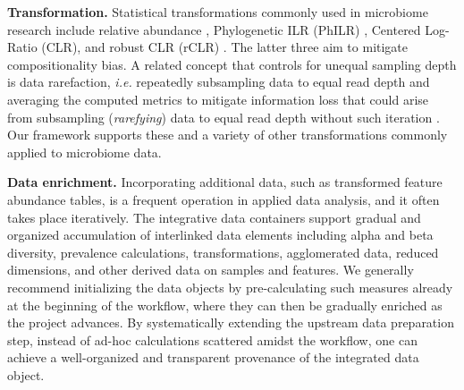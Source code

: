 \documentclass[
  sn-nature,
]{sn-jnl}
\begin{document}
\textbf{Transformation.} Statistical transformations commonly used in
microbiome research include relative abundance \citep{gloor2017},
Phylogenetic ILR (PhILR) \citep{silverman2017}, Centered Log-Ratio
(CLR), and robust CLR (rCLR) \citep{martino2019}. The latter three aim
to mitigate compositionality bias. A related concept that controls for
unequal sampling depth is data rarefaction, \emph{i.e.} repeatedly
subsampling data to equal read depth and averaging the computed metrics
to mitigate information loss \citep{schloss2024b} that could arise from
subsampling (\emph{rarefying}) data to equal read depth without such
iteration \citep{mcmurdie2014, schloss2024, willis2019b}. Our framework
supports these and a variety of other transformations commonly applied
to microbiome data.

\textbf{Data enrichment.} Incorporating additional data, such as
transformed feature abundance tables, is a frequent operation in applied
data analysis, and it often takes place iteratively. The integrative
data containers support gradual and organized accumulation of
interlinked data elements including alpha and beta diversity, prevalence
calculations, transformations, agglomerated data, reduced dimensions,
and other derived data on samples and features. We generally recommend
initializing the data objects by pre-calculating such measures already
at the beginning of the workflow, where they can then be gradually
enriched as the project advances. By systematically extending the
upstream data preparation step, instead of ad-hoc calculations scattered
amidst the workflow, one can achieve a well-organized and transparent
provenance of the integrated data object.
\end{document}
